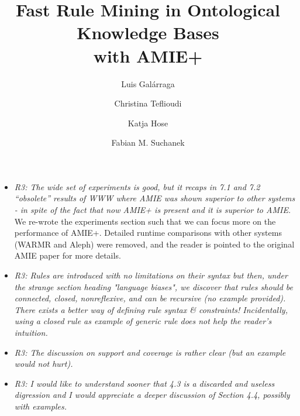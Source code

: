 \begin{figure*}[t!]
\hspace{.1\textwidth}
\begin{minipage}{.8\textwidth}
\large 
     \begin{itemize}   
      
      \item \textit{R3: The wide set of experiments is good, but it recaps in 7.1 and 7.2 ``obsolete'' results of WWW where AMIE was shown superior to other systems - 
      in spite of the fact that now AMIE+ is present and it is superior to AMIE. \\  }
      We re-wrote the experiments section such that we can focus more on the performance of AMIE+. Detailed runtime comparisons with other systems (WARMR and Aleph)
      were removed, and the reader is pointed to the original AMIE paper for more details.

      


      
      \item \textit{R3: Rules are introduced with no limitations on their syntax but then, under the strange section heading "language biases", 
      we discover that rules should be connected, closed, nonreflexive, and can be recursive (no example provided).       
      There exists a better way of defining rule syntax \& constraints! Incidentally, using a closed rule as example of generic rule does not help the reader's intuition. \\  }

      \item \textit{R3: The discussion on support and coverage is rather clear (but an example would not hurt).\\  }
      
      
      \item \textit{R3: I would like to understand sooner that 4.3 is a discarded and useless digression and I would appreciate a deeper discussion of Section 4.4, possibly with examples.\\  }
      
      
   
  \end{itemize}
\end{minipage}
\end{figure*}

\title{Fast Rule Mining in Ontological Knowledge Bases\\ with AMIE+}


\author{Luis Gal\'arraga\and
        Christina Teflioudi \and Katja Hose \and Fabian M. Suchanek
}

